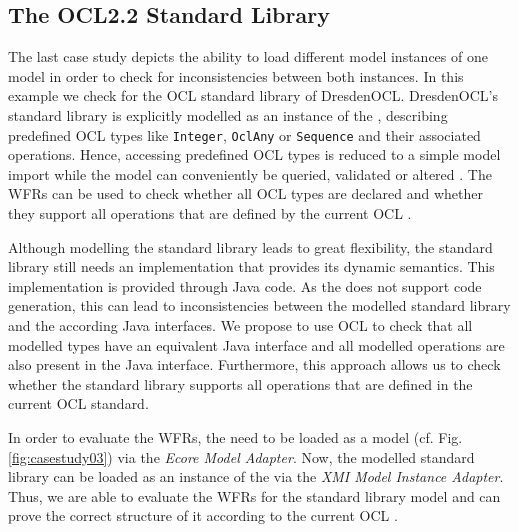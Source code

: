 \subsection{The OCL2.2 Standard Library}
The last case study depicts the ability to load different model instances of one model 
in order to check for inconsistencies between both instances. In this example we 
check  for the OCL standard library of DresdenOCL. 
DresdenOCL's standard library is explicitly modelled as 
an instance of the , describing predefined OCL types like \texttt{Integer}, 
\texttt{OclAny} or \texttt{Sequence} and their associated operations. 
Hence, accessing predefined OCL types is reduced to a simple model 
import while the model can conveniently be queried, validated or altered 
\cite{braeuerOCL07}. The WFRs can be used to check whether all OCL types are 
declared and whether they support all operations that are defined by the 
current OCL  .

Although modelling the standard library leads to great flexibility, the standard library 
still needs an implementation that provides its dynamic semantics. 
This implementation is provided through Java code. As the 
does not support code generation, this can lead to inconsistencies between 
the modelled standard library and the according Java interfaces.
We propose to use OCL to check that all modelled types have an equivalent Java 
interface and all modelled operations are also present in the Java interface. Furthermore, 
this approach allows us to check whether the standard library supports all operations that 
are defined in the current OCL standard.

In order to evaluate the WFRs, the  need to be loaded as a model (cf. Fig. 
\ref{fig:casestudy03})  via the \textit{Ecore Model Adapter}. Now, the modelled standard library 
can be loaded as an instance of the  via the \textit{XMI Model Instance Adapter}. Thus, 
we are able to evaluate the WFRs for the standard library model and can prove the correct 
structure of it according to the current OCL . 

